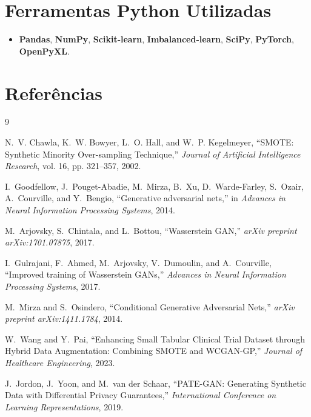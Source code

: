 \documentclass[12pt,a4paper]{article}
\begin{document}
\section{Ferramentas Python Utilizadas}
\begin{itemize}
    \item \textbf{Pandas}, \textbf{NumPy}, \textbf{Scikit-learn}, \textbf{Imbalanced-learn}, \textbf{SciPy}, \textbf{PyTorch}, \textbf{OpenPyXL}.
\end{itemize}

\section{Referências}

\begin{thebibliography}{9}

N.~V. Chawla, K.~W. Bowyer, L.~O. Hall, and W.~P. Kegelmeyer,
\newblock ``SMOTE: Synthetic Minority Over-sampling Technique,''
\newblock \emph{Journal of Artificial Intelligence Research}, vol. 16, pp. 321--357, 2002.

I.~Goodfellow, J.~Pouget-Abadie, M.~Mirza, B.~Xu, D.~Warde-Farley, S.~Ozair, A.~Courville, and Y.~Bengio,
\newblock ``Generative adversarial nets,''
\newblock in \emph{Advances in Neural Information Processing Systems}, 2014.

M.~Arjovsky, S.~Chintala, and L.~Bottou,
\newblock ``Wasserstein GAN,''
\newblock \emph{arXiv preprint arXiv:1701.07875}, 2017.

I.~Gulrajani, F.~Ahmed, M.~Arjovsky, V.~Dumoulin, and A.~Courville,
\newblock ``Improved training of Wasserstein GANs,''
\newblock \emph{Advances in Neural Information Processing Systems}, 2017.

M.~Mirza and S.~Osindero,
\newblock ``Conditional Generative Adversarial Nets,''
\newblock \emph{arXiv preprint arXiv:1411.1784}, 2014.

W.~Wang and Y.~Pai,
\newblock ``Enhancing Small Tabular Clinical Trial Dataset through Hybrid Data Augmentation: Combining SMOTE and WCGAN-GP,''
\newblock \emph{Journal of Healthcare Engineering}, 2023.

J.~Jordon, J.~Yoon, and M.~van der Schaar,
\newblock ``PATE-GAN: Generating Synthetic Data with Differential Privacy Guarantees,''
\newblock \emph{International Conference on Learning Representations}, 2019.

\end{thebibliography}
\end{document}
